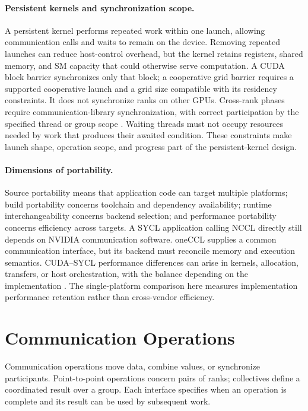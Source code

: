 \paragraph{Persistent kernels and synchronization scope.}
A persistent kernel performs repeated work within one launch, allowing communication calls and waits to remain on the device. Removing repeated launches can reduce host-control overhead, but the kernel retains registers, shared memory, and SM capacity that could otherwise serve computation. A CUDA block barrier synchronizes only that block; a cooperative grid barrier requires a supported cooperative launch and a grid size compatible with its residency constraints. It does not synchronize ranks on other GPUs. Cross-rank phases require communication-library synchronization, with correct participation by the specified thread or group scope \cite{nvidia_cuda_programming_2026,ma_demystifying_2026}. Waiting threads must not occupy resources needed by work that produces their awaited condition. These constraints make launch shape, operation scope, and progress part of the persistent-kernel design.

\paragraph{Dimensions of portability.}
Source portability means that application code can target multiple platforms; build portability concerns toolchain and dependency availability; runtime interchangeability concerns backend selection; and performance portability concerns efficiency across targets. A SYCL application calling NCCL directly still depends on NVIDIA communication software. oneCCL supplies a common communication interface, but its backend must reconcile memory and execution semantics. CUDA--SYCL performance differences can arise in kernels, allocation, transfers, or host orchestration, with the balance depending on the implementation \cite{mijic_benchmark_2023,shen_sycl_2026}. The single-platform comparison here measures implementation performance retention rather than cross-vendor efficiency.

\section{Communication Operations}\label{sec:communication-operations}

Communication operations move data, combine values, or synchronize participants. Point-to-point operations concern pairs of ranks; collectives define a coordinated result over a group. Each interface specifies when an operation is complete and its result can be used by subsequent work.

